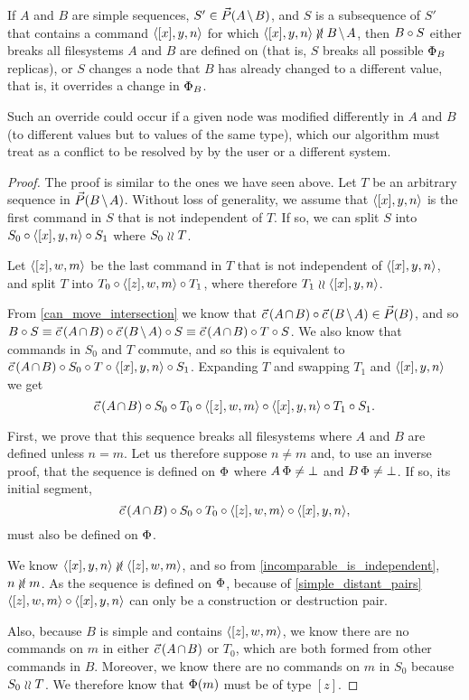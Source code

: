 \begin{myth}
If $A$ and $B$ are simple sequences,
$S'\in\orderset{\ambnp}$,
and $S$ is a subsequence of $S'$ that
contains a command $\langle{[x],y,n}\rangle$ for which $\cxynv\nindep\bmanp$,
then $B\mathbin{\circ} S$ either breaks all filesystems $A$ and $B$ are defined on
(that is, $S$ breaks all possible $\Phi_B$ replicas),
or $S$ changes a node that $B$ has already changed to a different value,
that is, it overrides a change in $\Phi_B$.
\end{myth}
Such an override could occur if a given node was modified differently in
$A$ and $B$ (to different values but to values of the same type), which 
our algorithm must treat as a conflict to be resolved by
by the user or a different system.
\begin{proof}
The proof is similar to the ones we have seen above.
Let $T$ be an arbitrary sequence in $\orderset{\bmanp}$.
Without loss of generality, we assume that $\langle{[x],y,n}\rangle$ is the first command in $S$
that is not independent of $T$.
If so, we can split $S$ into $S_0\mathbin{\circ}\langle{[x],y,n}\rangle\mathbin{\circ} S_1$ where $S_0\mathrel{\wr\wr} T$.

Let $\langle{[z],w,m}\rangle$ be the last command in $T$ that is not independent of $\langle{[x],y,n}\rangle$,
and split $T$ into $T_0\mathbin{\circ}\langle{[z],w,m}\rangle\mathbin{\circ} T_1$, where therefore $T_1\mathrel{\wr\wr}\langle{[x],y,n}\rangle$.

From \cref{can_move_intersection} we know that
$\acb\cc\bma \in \orderset{B}$, and so
$B\cc S \equiv \acb\cc\bma\cc S \equiv \acb\cc T\cc S$.
We also know that commands in $S_0$ and $T$ commute, and so this is equivalent to
$\vec{c}\,({A\nobreak\hspace{-1pt plus 1pt}\nobreak\cap\nobreak\hspace{-1pt plus 1pt}\nobreak B})\mathbin{\circ} S_0\mathbin{\circ} T\mathbin{\circ}\langle{[x],y,n}\rangle\mathbin{\circ} S_1$.
Expanding $T$ and swapping $T_1$ and $\langle{[x],y,n}\rangle$ we get
\[ \vec{c}\,({A\nobreak\hspace{-1pt plus 1pt}\nobreak\cap\nobreak\hspace{-1pt plus 1pt}\nobreak B})\mathbin{\circ} S_0\mathbin{\circ} T_0 \mathbin{\circ} \langle{[z],w,m}\rangle \mathbin{\circ} \langle{[x],y,n}\rangle\mathbin{\circ} T_1\mathbin{\circ} S_1. \]

First, we prove that this sequence breaks all filesystems
where $A$ and $B$ are defined unless $n=m$.
Let us therefore suppose $n\neq m$ and, to use an inverse proof,
that the sequence is defined on $\Phi$ 
where $A\,\Phi\neq\bot$ and $B\,\Phi\neq\bot$.
If so, its initial segment,
\[ \vec{c}\,({A\nobreak\hspace{-1pt plus 1pt}\nobreak\cap\nobreak\hspace{-1pt plus 1pt}\nobreak B})\mathbin{\circ} S_0\mathbin{\circ} T_0 \mathbin{\circ} \langle{[z],w,m}\rangle \mathbin{\circ} \langle{[x],y,n}\rangle, \]
must also be defined on $\Phi$.

We know $\cxynv\nindep\czwmv$, and so from \cref{incomparable_is_independent}, $n\nunrel m$.
As the sequence is defined on $\Phi$,
because of \cref{simple_distant_pairs}
$\langle{[z],w,m}\rangle\mathbin{\circ}\langle{[x],y,n}\rangle$ can only be a construction or destruction pair.

Also, because $B$ is simple and contains $\langle{[z],w,m}\rangle$,
we know there are no commands on $m$ 
in either $\acb$ or $T_0$, which are both formed from other commands in $B$.
Moreover, we know there are no commands on $m$ in $S_0$ because $S_0\mathrel{\wr\wr} T$.
We therefore know that $\Phi(m)$ must be of type $[z]$.


\end{proof}
